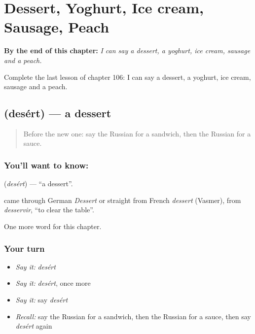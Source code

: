 
\chapter{Dessert, Yoghurt, Ice cream, Sausage, Peach}
\label{ch:ru-dessert-yoghurt-ice-cream-sausage-peach}

\begin{chapteropening}
\textbf{By the end of this chapter:} \emph{I can say a dessert, a yoghurt, ice cream, sausage and a peach.}

Complete the last lesson of chapter 106: I can say a dessert, a yoghurt, ice cream, sausage and a peach.
\end{chapteropening}

\section[\texorpdfstring{\ru{десерт} (desért)}{десерт (desért)}]{ (desért) — a dessert}

\label{lesson:RU-C106-dessert}



\begin{quote}
Before the new one: say the Russian for a sandwich, then the Russian for a sauce.
\end{quote}

\subsection*{You'll want to know: }
\textbf{} (\emph{desért}) — \textquotedblleft{}a dessert\textquotedblright{}.

\begin{cousinweb}
\textbf{} came through German \emph{Dessert} or straight from French \emph{dessert} (Vasmer), from \emph{desservir}, \textquotedblleft{}to clear the table\textquotedblright{}.
\end{cousinweb}

\begin{grammarlens}[title={What you've built}]
One more word for this chapter.
\end{grammarlens}

\subsection*{Your turn}
\begin{itemize}
\raggedright
  \item \emph{Say it:} \emph{desért}
  \item \emph{Say it:} \emph{desért}, once more
  \item \emph{Say it:} say \emph{desért}
  \item \emph{Recall:} say the Russian for a sandwich, then the Russian for a sauce, then say \emph{desért} again
\end{itemize}

